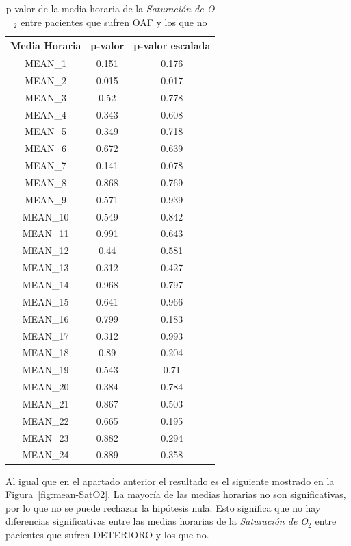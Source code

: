 \begin{table}[H]
    \centering
    \begin{tabular}{|c|c|c|}
        \hline
        \textbf{Media Horaria} & \textbf{p-valor} & \textbf{p-valor escalada} \\
        \hline
        MEAN\_1 & 0.151 & 0.176 \\
        MEAN\_2 & 0.015 & 0.017 \\
        MEAN\_3 & 0.52 & 0.778 \\
        MEAN\_4 & 0.343 & 0.608 \\
        MEAN\_5 & 0.349 & 0.718 \\
        MEAN\_6 & 0.672 & 0.639 \\
        MEAN\_7 & 0.141 & 0.078 \\
        MEAN\_8 & 0.868 & 0.769 \\
        MEAN\_9 & 0.571 & 0.939 \\
        MEAN\_10 & 0.549 & 0.842 \\
        MEAN\_11 & 0.991 & 0.643 \\
        MEAN\_12 & 0.44 & 0.581 \\
        MEAN\_13 & 0.312 & 0.427 \\
        MEAN\_14 & 0.968 & 0.797 \\
        MEAN\_15 & 0.641 & 0.966 \\
        MEAN\_16 & 0.799 & 0.183 \\
        MEAN\_17 & 0.312 & 0.993 \\
        MEAN\_18 & 0.89 & 0.204 \\
        MEAN\_19 & 0.543 & 0.71 \\
        MEAN\_20 & 0.384 & 0.784 \\
        MEAN\_21 & 0.867 & 0.503 \\
        MEAN\_22 & 0.665 & 0.195 \\
        MEAN\_23 & 0.882 & 0.294 \\
        MEAN\_24 & 0.889 & 0.358 \\
        \hline
    \end{tabular}
    \caption{p-valor de la media horaria de la \textit{Saturación de O$_2$} entre pacientes que sufren OAF y los que no}
\end{table}

Al igual que en el apartado anterior el resultado es el siguiente mostrado en la Figura~\ref{fig:mean-SatO2}. La mayoría de las medias horarias no son significativas, por lo que no se puede rechazar la hipótesis nula. Esto significa que no hay diferencias significativas entre las medias horarias de la \textit{Saturación de O$_2$} entre pacientes que sufren DETERIORO y los que no.

